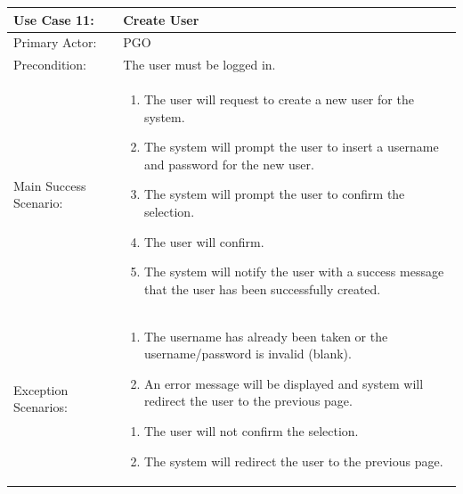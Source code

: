 \documentclass{article}
\begin{document}
\begin{tabular} {| m{5cm} | m{10cm} |}
\hline
Use Case 11: & Create User \\
\hline
Primary Actor: & PGO \\
\hline
Precondition: & The user must be logged in. \\
\hline
Main Success Scenario: & \begin{enumerate} \itemsep0em \item The user will request to create a new user for the system. 
\item The system will prompt the user to insert a username and password for the new user.
\item The system will prompt the user to confirm the selection.
\item The user will confirm.
\item The system will notify the user with a success message that the user has been successfully created.
\end{enumerate}\\
\hline
Exception Scenarios: & \begin{enumerate} \itemsep0em \item The username has already been taken or the username/password is invalid (blank).
\item An error message will be displayed and system will redirect the user to the previous page.
\end{enumerate} \begin{enumerate}  \itemsep0em \item The user will not confirm the selection.
\item The system will redirect the user to the previous page. \end{enumerate} \\
\hline
\end{tabular}
\\ \\ \\ \\
\end{document}
